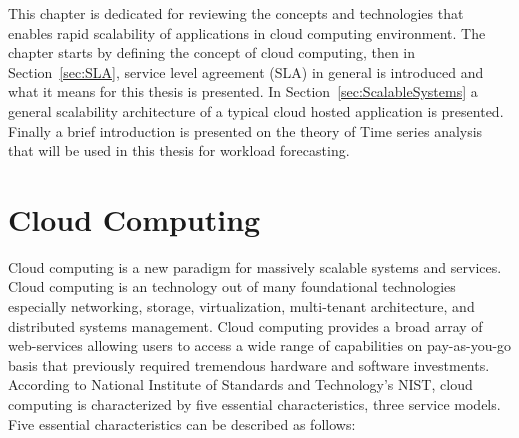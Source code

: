 This chapter is dedicated for reviewing the concepts and technologies that enables rapid scalability of applications in cloud computing environment. The chapter starts by defining the concept of cloud computing, then in Section~\ref{sec:SLA}, service level agreement (SLA) in general is introduced and what it means for this thesis is presented. In Section~\ref{sec:ScalableSystems} a general scalability architecture of a typical cloud hosted application is presented. Finally  a brief introduction is presented on the theory of Time series analysis that will be used in this thesis for workload forecasting.

\section{Cloud Computing}
\label{sec:Cloud Computing}
Cloud computing\cite{mell2011nist} is a new paradigm for massively scalable systems and services. Cloud computing is an technology out of many foundational technologies especially networking, storage, virtualization, multi-tenant architecture, and distributed systems management. Cloud computing provides a broad array of web-services allowing users to access a wide range of capabilities on pay-as-you-go basis that previously required tremendous hardware and software investments.
\\
According to National Institute of Standards and Technology's NIST\cite{mell2011nist}, cloud computing is characterized by five essential characteristics, three service models.
\\
Five essential characteristics can be described as follows:
